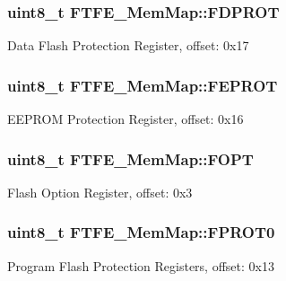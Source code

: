 \subsubsection[{F\+D\+P\+R\+O\+T}]{\setlength{\rightskip}{0pt plus 5cm}uint8\+\_\+t F\+T\+F\+E\+\_\+\+Mem\+Map\+::\+F\+D\+P\+R\+O\+T}\label{struct_f_t_f_e___mem_map_aab8bdf05ca369ec198ec06cc6c08c54e}
Data Flash Protection Register, offset\+: 0x17 \hypertarget{struct_f_t_f_e___mem_map_ad2c7b03da2909050081c4e293bedcbab}{}
\subsubsection[{F\+E\+P\+R\+O\+T}]{\setlength{\rightskip}{0pt plus 5cm}uint8\+\_\+t F\+T\+F\+E\+\_\+\+Mem\+Map\+::\+F\+E\+P\+R\+O\+T}\label{struct_f_t_f_e___mem_map_ad2c7b03da2909050081c4e293bedcbab}
E\+E\+P\+R\+O\+M Protection Register, offset\+: 0x16 \hypertarget{struct_f_t_f_e___mem_map_af24ed572a9a06cefc7c238c08e2aa332}{}
\subsubsection[{F\+O\+P\+T}]{\setlength{\rightskip}{0pt plus 5cm}uint8\+\_\+t F\+T\+F\+E\+\_\+\+Mem\+Map\+::\+F\+O\+P\+T}\label{struct_f_t_f_e___mem_map_af24ed572a9a06cefc7c238c08e2aa332}
Flash Option Register, offset\+: 0x3 \hypertarget{struct_f_t_f_e___mem_map_ad874550db74efbacd41af6fecb4f3f76}{}
\subsubsection[{F\+P\+R\+O\+T0}]{\setlength{\rightskip}{0pt plus 5cm}uint8\+\_\+t F\+T\+F\+E\+\_\+\+Mem\+Map\+::\+F\+P\+R\+O\+T0}\label{struct_f_t_f_e___mem_map_ad874550db74efbacd41af6fecb4f3f76}
Program Flash Protection Registers, offset\+: 0x13 \hypertarget{struct_f_t_f_e___mem_map_a5a6edd9cc85f5b822067daf101cb67b3}{}
